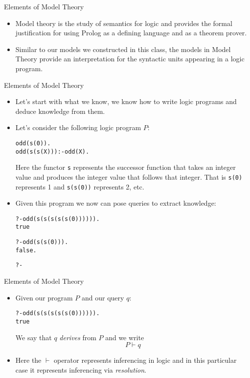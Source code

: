 \documentclass{beamer}
\begin{document}
\begin{frame}[fragile]{Elements of Model Theory}

\begin{itemize}
\item 
Model theory is the study of semantics for logic and provides the formal justification 
for using Prolog as a defining language and as a theorem prover.

\item
Similar to our models we constructed in this class, the models in Model  Theory
provide an interpretation for the syntactic units appearing in a logic program.
\end{itemize}
\end{frame}


\begin{frame}[fragile]{Elements of Model Theory}

\small
\begin{itemize}
\item 
Let's start with what we know, we know how to write logic programs and deduce 
knowledge from them.

\item
Let's consider the following logic program $P$:
{\scriptsize
\begin{alltt}
odd(s(0)).
odd(s(s(X))) :- odd(X).
\end{alltt}
}
Here the functor {\tt s} represents the successor function that takes an integer value and produces the integer
value that follows that integer.  That is {\tt s(0)} represents 1 and {\tt s(s(0))} represents 2, etc.

\item
Given this program we now can pose queries to extract knowledge:
{\scriptsize
\begin{alltt}
?- odd(s(s(s(s(s(0)))))).
true 

?- odd(s(s(0))).
false.

?- 
\end{alltt}
}
\end{itemize}
\end{frame}


\begin{frame}[fragile]{Elements of Model Theory}

\small
\begin{itemize}
\item 
Given our program $P$ and our query $q$:
{\scriptsize
\begin{alltt}
?- odd(s(s(s(s(s(0)))))).
true 
\end{alltt}
}
We say that $q$ {\em derives} from $P$ and we write
\[
P \vdash q
\]

\item
Here the $\vdash$ operator represents inferencing in logic and in this particular case it represents
inferencing via {\em resolution}.

\end{itemize}
\end{frame}
\end{document}
